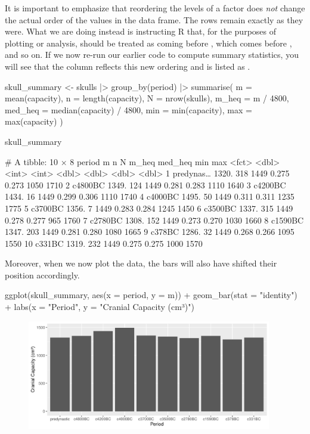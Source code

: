 It is important to emphasize that reordering the levels of a factor does \textit{not} change the actual order of the values in the data frame. The rows remain exactly as they were. What we are doing instead is instructing R that, for the purposes of plotting or analysis,  should be treated as coming before , which comes before , and so on. If we now re-run our earlier code to compute summary statistics, you will see that the  column reflects this new ordering and is listed as .

\begin{inR}
skull_summary <- skulls |>
  group_by(period) |>
  summarise(
    m = mean(capacity),
    n = length(capacity),
    N = nrow(skulls),
    m_heq = m / 4800,
    med_heq = median(capacity) / 4800,
    min = min(capacity),
    max = max(capacity)
  )

skull_summary
\end{inR}

\begin{outR}
# A tibble: 10 × 8
   period        m     n     N m_heq med_heq   min   max
   <fct>     <dbl> <int> <int> <dbl>   <dbl> <dbl> <dbl>
 1 predynas… 1320.   318  1449 0.275   0.273  1050  1710
 2 c4800BC   1349.   124  1449 0.281   0.283  1110  1640
 3 c4200BC   1434.    16  1449 0.299   0.306  1110  1740
 4 c4000BC   1495.    50  1449 0.311   0.311  1235  1775
 5 c3700BC   1356.     7  1449 0.283   0.284  1245  1450
 6 c3500BC   1337.   315  1449 0.278   0.277   965  1760
 7 c2780BC   1308.   152  1449 0.273   0.270  1030  1660
 8 c1590BC   1347.   203  1449 0.281   0.280  1080  1665
 9 c378BC    1286.    32  1449 0.268   0.266  1095  1550
10 c331BC    1319.   232  1449 0.275   0.275  1000  1570
\end{outR}

\noindent
Moreover, when we now plot the data, the bars will also have shifted their position accordingly.

\begin{inR}
ggplot(skull_summary, aes(x = period, y = m)) +
  geom_bar(stat = "identity") +
  labs(x = "Period", y = "Cranial Capacity (cm³)")
\end{inR}

\vspace{2em}

\begin{figure}[H]
\includegraphics[width = 0.95\textwidth]{graphics/ch3Figs/bar_2.pdf}
\end{figure}

